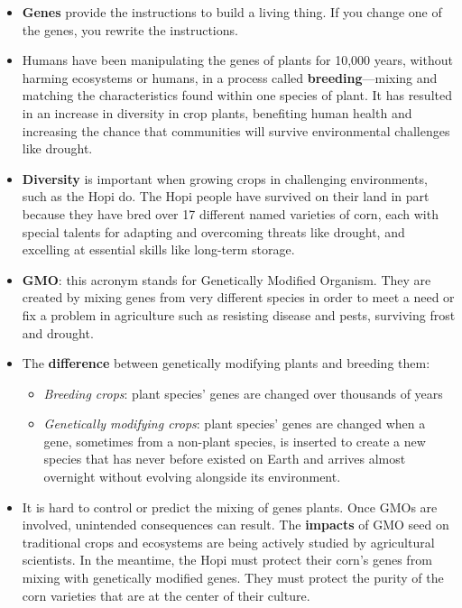 \documentclass[12pt,]{article}
\providecommand{\tightlist}{%
  \setlength{\itemsep}{0pt}\setlength{\parskip}{0pt}}
\begin{document}
\begin{itemize}
\tightlist
\item
  \textbf{Genes} provide the instructions to build a living thing. If you
  change one of the genes, you rewrite the instructions.
\item
  Humans have been manipulating the genes of plants for 10,000 years,
  without harming ecosystems or humans, in a process called
  \textbf{breeding}---mixing and matching the characteristics found within
  one species of plant. It has resulted in an increase in diversity in
  crop plants, benefiting human health and increasing the chance that
  communities will survive environmental challenges like drought.
\item
  \textbf{Diversity} is important when growing crops in challenging
  environments, such as the Hopi do. The Hopi people have survived on
  their land in part because they have bred over 17 different named
  varieties of corn, each with special talents for adapting and
  overcoming threats like drought, and excelling at essential skills
  like long-term storage.
\item
  \textbf{GMO}: this acronym stands for Genetically Modified Organism. They
  are created by mixing genes from very different species in order to
  meet a need or fix a problem in agriculture such as resisting
  disease and pests, surviving frost and drought.
\item
  The \textbf{difference} between genetically modifying plants and breeding
  them:

  \begin{itemize}
  \tightlist
  \item
    \emph{Breeding crops}: plant species' genes are changed over
    thousands of years
  \item
    \emph{Genetically modifying crops}: plant species' genes are changed
    when a gene, sometimes from a non-plant species, is inserted
    to create a new species that has never before existed on Earth
    and arrives almost overnight without evolving alongside its
    environment.
  \end{itemize}
\item
  It is hard to control or predict the mixing of genes plants. Once
  GMOs are involved, unintended consequences can result. The
  \textbf{impacts} of GMO seed on traditional crops and ecosystems are
  being actively studied by agricultural scientists. In the meantime,
  the Hopi must protect their corn's genes from mixing with
  genetically modified genes. They must protect the purity of the corn
  varieties that are at the center of their culture.
\end{itemize}
\end{document}
